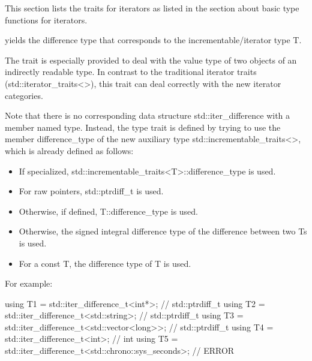 

This section lists the traits for iterators as listed in the section about basic type functions for iterators.



yields the difference type that corresponds to the incrementable/iterator type T.

The trait is especially provided to deal with the value type of two objects of an indirectly readable type. In contrast to the traditional iterator traits (std::iterator\_traits<>), this trait can deal correctly with the new iterator categories. 

Note that there is no corresponding data structure std::iter\_difference with a member named type. Instead, the type trait is defined by trying to use the member difference\_type of the new auxiliary type std::incrementable\_traits<>, which is already defined as follows:

\begin{itemize}
\item 
If specialized, std::incrementable\_traits<T>::difference\_type is used.

\item
For raw pointers, std::ptrdiff\_t is used.

\item
Otherwise, if defined, T::difference\_type is used.

\item
Otherwise, the signed integral difference type of the difference between two Ts is used.

\item
For a const T, the difference type of T is used.
\end{itemize}

For example:

\begin{cpp}
using T1 = std::iter_difference_t<int*>; // std::ptrdiff_t
using T2 = std::iter_difference_t<std::string>; // std::ptrdiff_t
using T3 = std::iter_difference_t<std::vector<long>>; // std::ptrdiff_t
using T4 = std::iter_difference_t<int>; // int
using T5 = std::iter_difference_t<std::chrono::sys_seconds>; // ERROR
\end{cpp}



